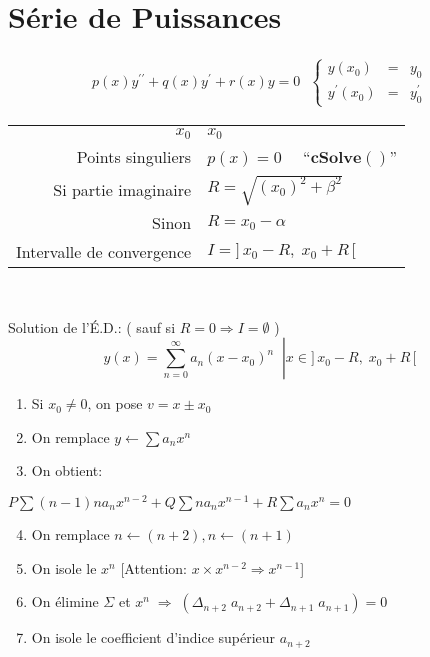 \section{Série de Puissances}
\vspace{-1\baselineskip}
\begin{gather*}
p(x)y^{\prime\prime} +q(x)y^{\prime}+r(x)y=0 ~~~  \left\{ \begin{array}{rcl}
y(x_0)& =& y_0\\
y^{\prime}(x_0) & = & y^{\prime}_0
\end{array} \right.
\end{gather*}
\centering
\begin{tabular}{rl}\hline
    $x_0$ & $x_0$ \\
    Points singuliers & \(p(x)=0\) ~~``\(\mathbf{cSolve}()\)'' \\
    Si partie imaginaire & \(R=\sqrt{(x_0)^2 + \beta^2}\)\\
    Sinon & \(R=x_0-\alpha\)\\
    Intervalle de convergence & \(I=]\,x_0-R,\; x_0+R\,[\)\\\hline
\end{tabular}
\\\raggedright
Solution de l'É.D.: ( sauf si $R=0 \Rightarrow I=\emptyset$ )
\vspace{-0.25em}
\begin{equation*}
    \left. y(x)=\sum^{\infty}_{n=0} a_n (x-x_0)^n  \;\;\right| x \in ]\,x_0-R,\; x_0+R\,[
\end{equation*}
\vspace{-0.25em}
\begin{enumerate}[nosep]
    \item Si $x_0 \neq 0$, on pose $v=x\pm x_0$
    \item On remplace $y \longleftarrow \sum{ a_n x^n}$
    \item On obtient:
\end{enumerate}
\centering
\(
    P\sum{ (n-1)n a_n x^{n-2}} +Q\sum{n a_n x^{n-1}}+R\sum{a_n x^n}=0
\)\\\raggedright

\begin{enumerate}[nosep]
\setcounter{enumi}{3}
    \item On remplace $n\leftarrow (n+2), n\leftarrow (n+1)$
    \item On isole le $x^n$ \hspace{1em}[Attention: $x\times x^{n-2}\Rightarrow x^{n-1}$]
    \item On élimine $\Sigma$ et $x^n \;\Rightarrow\;(\Delta_{n+2}\; a_{n+2}+\Delta_{n+1}\; a_{n+1})= 0$
    \item On isole le coefficient d'indice supérieur $a_{n+2}$
\end{enumerate}

